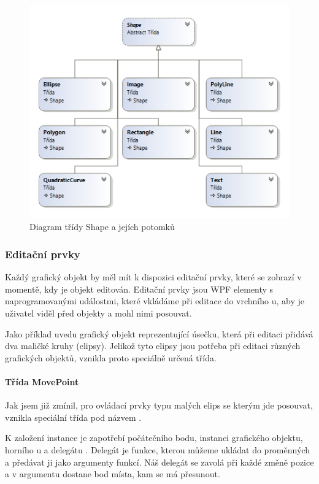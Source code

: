 \documentclass[
  field=inf,
  biblatex,
  glossaries,
  index
]{kidiplom}
\begin{document}
\begin{figure}
\includegraphics[width=15cm]{img/shape_diag}
\caption{Diagram třídy Shape a jejích potomků}
\end{figure}  

\subsubsection{Editační prvky}
Každý grafický objekt by měl mít k dispozici editační prvky, které se zobrazí v momentě, kdy je objekt editován. Editační prvky jsou WPF elementy s naprogramovanými událostmi, které vkládáme při editace do vrchního u, aby je uživatel viděl před objekty a mohl nimi posouvat.

Jako příklad uvedu grafický objekt reprezentující úsečku, která při editaci přidává dva maličké kruhy (elipsy). Jelikož tyto elipsy jsou potřeba při editaci různých grafických objektů, vznikla proto speciálně určená třída.

\paragraph{Třída MovePoint}
Jak jsem již zmínil, pro ovládací prvky typu malých elips se kterým jde posouvat, vznikla speciální třída pod názvem .

K založení instance je zapotřebí počátečního bodu, instanci grafického objektu, horního u a delegátu . Delegát je funkce, kterou můžeme ukládat do proměnných a předávat ji jako argumenty funkcí. Náš delegát se zavolá při každé změně pozice a v argumentu dostane bod místa, kam se má přesunout.
\end{document}
